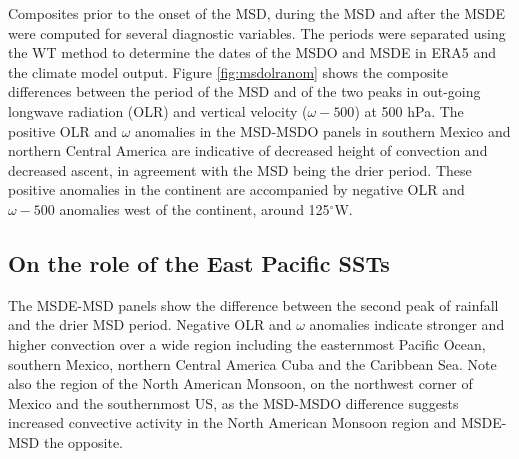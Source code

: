 Composites prior to the onset of the MSD, during the MSD and after the MSDE were computed for several diagnostic variables. The periods were separated using the WT method to determine the dates of the MSDO and MSDE in ERA5 and the climate model output.
Figure \ref{fig:msdolranom} shows the composite differences between the period of the MSD and of the two peaks in out-going longwave radiation (OLR) and vertical velocity ($\omega-500$) at 500 hPa.
The positive OLR and $\omega$ anomalies in the MSD-MSDO panels in southern Mexico and northern Central America are indicative of decreased height of convection and decreased ascent, in agreement with the MSD being the drier period. These positive anomalies in the continent are accompanied by negative OLR and $\omega-500$ anomalies west of the continent, around 125$^\circ$W. 

\subsection{On the role of the East Pacific SSTs}


The MSDE-MSD panels show the difference between the second peak of rainfall and the drier MSD period. Negative OLR and $\omega$ anomalies indicate stronger and higher convection over a wide region including the easternmost Pacific Ocean, southern Mexico, northern Central America Cuba and the Caribbean Sea.  
Note also the region of the North American Monsoon, on the northwest corner of Mexico and the southernmost US, as the MSD-MSDO difference suggests increased convective activity in the North American Monsoon region and 
MSDE-MSD the opposite. 

